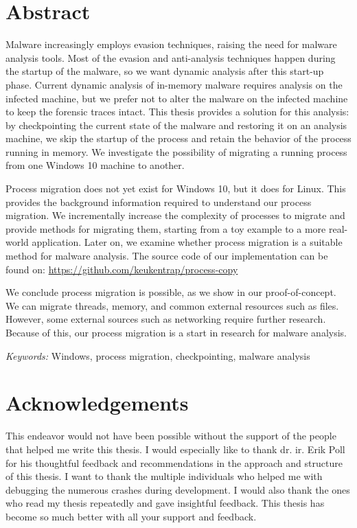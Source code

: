 \documentclass[a4paper, 11pt, english]{report}
\begin{document}

\if@twoside 
	\shipout\null
\fi

\chapter*{Abstract}
\label{ch:abstract}
Malware increasingly employs evasion techniques, raising the need for malware analysis tools.
Most of the evasion and anti-analysis techniques happen during the startup of the malware, so we want dynamic analysis after this start-up phase. %
Current dynamic analysis of in-memory malware requires analysis on the infected machine, but we prefer not to alter the malware on the infected machine to keep the forensic traces intact.
This thesis provides a solution for this analysis:
by checkpointing the current state of the malware and restoring it on an analysis machine, we skip the startup of the process and retain the behavior of the process running in memory.
We investigate the possibility of migrating a running process from one Windows 10 machine to another.

Process migration does not yet exist for Windows 10, but it does for Linux.
This provides the background information required to understand our process migration.
We incrementally increase the complexity of processes to migrate and provide methods for migrating them, starting from a toy example to a more real-world application.
Later on, we examine whether process migration is a suitable method for malware analysis.
The source code of our implementation can be found on: \url{https://github.com/keukentrap/process-copy}

We conclude process migration is possible, as we show in our proof-of-concept. We can migrate threads, memory, and common external resources such as files. However, some external sources such as networking require further research. Because of this, our process migration is a start in research for malware analysis.

\textit{Keywords:} Windows, process migration, checkpointing, malware analysis


\chapter*{Acknowledgements}
This endeavor would not have been possible without the support of the people that helped me write this thesis. I would especially like to thank dr. ir. Erik Poll for his thoughtful feedback and recommendations in the approach and structure of this thesis. I want to thank the multiple individuals who helped me with debugging the numerous crashes during development. I would also thank the ones who read my thesis repeatedly and gave insightful feedback. This thesis has become so much better with all your support and feedback.
\end{document}
